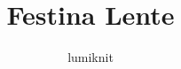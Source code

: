 \documentclass[8pt]{article}
\title{Festina Lente}
\author{lumiknit}
\begin{document}
\maketitle
\begin{multicols}{3}
\end{multicols}
\end{document}
